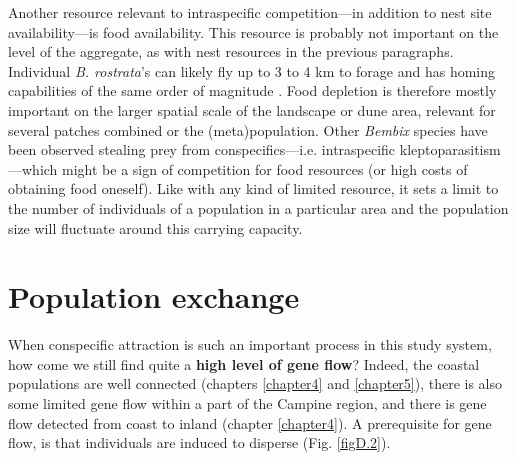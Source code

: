 \documentclass[10pt, twoside]{book} %
\begin{document}
	Another resource relevant to intraspecific competition---in addition to nest site availability---is food availability. This resource is probably not important on the level of the aggregate, as with nest resources in the previous paragraphs. Individual \textit{B. rostrata}'s can likely fly up to 3 to 4 km to forage \citep{nielsen1945} and has homing capabilities of the same order of magnitude \citep{tengo1990, schone1991}. Food depletion is therefore mostly important on the larger spatial scale of the landscape or dune area, relevant for several patches combined or the (meta)population. Other \textit{Bembix} species have been observed stealing prey from conspecifics---i.e. intraspecific kleptoparasitism \citep{peckham1905, evans2007}---which might be a sign of competition for food resources (or high costs of obtaining food oneself). Like with any kind of limited resource, it sets a limit to the number of individuals of a population in a particular area and the population size will fluctuate around this carrying capacity.\clearpage
	
	\section{Population exchange}
	When conspecific attraction is such an important process in this study system, how come we still find quite a \textbf{high level of gene flow}? Indeed, the coastal populations are well connected (chapters \ref{chapter4} and \ref{chapter5}), there is also some limited gene flow within a part of the Campine region, and there is gene flow detected from coast to inland (chapter \ref{chapter4}). A prerequisite for gene flow, is that individuals are induced to disperse (Fig. \ref{figD.2}).\\
	
\end{document}
